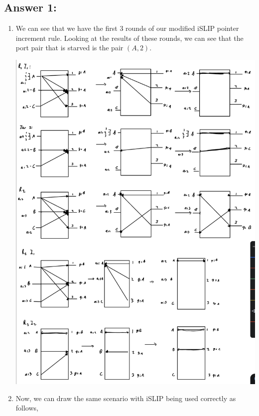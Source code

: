 \documentclass[10pt]{article}
\begin{document}
\subsection*{Answer 1:}
\begin{enumerate}
    \item We can see that we have the first 3 rounds of our modified iSLIP pointer increment rule. Looking at the results of these rounds, we can see that the port pair that is starved is the pair $(A,2)$.
    \begin{center}
        \includegraphics[scale = 0.25]{hw7pr1a.jpeg}
    \end{center}
    \item Now, we can draw the same scenario with iSLIP being used correctly as follows,
    \begin{center}

\end{center}
\end{enumerate}
\end{document}
